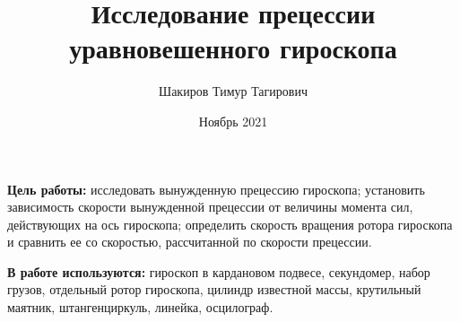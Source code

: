 \documentclass[a4paper, 12pt]{article}
\title{Исследование прецессии уравновешенного гироскопа}
\author{Шакиров Тимур Тагирович}
\date{Ноябрь 2021}
\begin{document}
\maketitle

\textbf{Цель работы:} исследовать вынужденную прецессию гироскопа; установить зависимость скорости вынужденной прецессии от величины момента сил, действующих на ось гироскопа; определить скорость вращения ротора гироскопа и сравнить ее со скоростью, рассчитанной по скорости прецессии.

\vspace{1cm}

\textbf{В работе используются:} гироскоп в кардановом подвесе, секундомер, набор грузов, отдельный ротор гироскопа, цилиндр известной массы, крутильный маятник, штангенциркуль, линейка, осцилограф.

\vspace{1cm}
\end{document}
